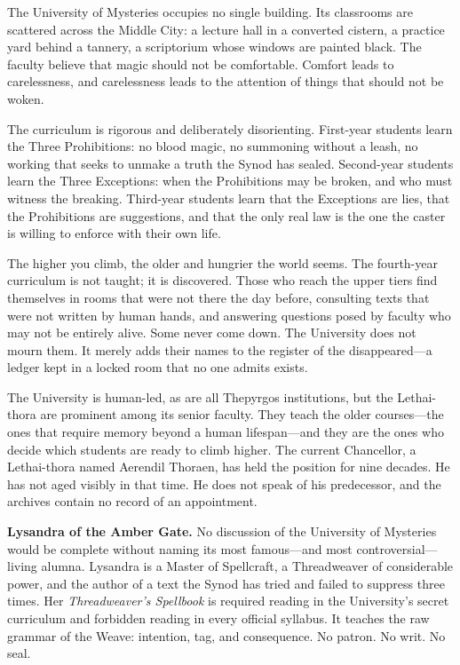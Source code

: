 \documentclass[10pt,twocolumn]{book}
\begin{document}
The University of Mysteries occupies no single building. Its classrooms are scattered across the Middle City: a lecture hall in a converted cistern, a practice yard behind a tannery, a scriptorium whose windows are painted black. The faculty believe that magic should not be comfortable. Comfort leads to carelessness, and carelessness leads to the attention of things that should not be woken.

The curriculum is rigorous and deliberately disorienting. First-year students learn the Three Prohibitions: no blood magic, no summoning without a leash, no working that seeks to unmake a truth the Synod has sealed. Second-year students learn the Three Exceptions: when the Prohibitions may be broken, and who must witness the breaking. Third-year students learn that the Exceptions are lies, that the Prohibitions are suggestions, and that the only real law is the one the caster is willing to enforce with their own life.

The higher you climb, the older and hungrier the world seems. The fourth-year curriculum is not taught; it is discovered. Those who reach the upper tiers find themselves in rooms that were not there the day before, consulting texts that were not written by human hands, and answering questions posed by faculty who may not be entirely alive. Some never come down. The University does not mourn them. It merely adds their names to the register of the disappeared---a ledger kept in a locked room that no one admits exists.

The University is human-led, as are all Thepyrgos institutions, but the Lethai-thora are prominent among its senior faculty. They teach the older courses---the ones that require memory beyond a human lifespan---and they are the ones who decide which students are ready to climb higher. The current Chancellor, a Lethai-thora named Aerendil Thoraen, has held the position for nine decades. He has not aged visibly in that time. He does not speak of his predecessor, and the archives contain no record of an appointment.

\noindent\textbf{Lysandra of the Amber Gate.} No discussion of the University of Mysteries would be complete without naming its most famous---and most controversial---living alumna. Lysandra is a Master of Spellcraft, a Threadweaver of considerable power, and the author of a text the Synod has tried and failed to suppress three times. Her \textit{Threadweaver's Spellbook} is required reading in the University's secret curriculum and forbidden reading in every official syllabus. It teaches the raw grammar of the Weave: intention, tag, and consequence. No patron. No writ. No seal.
\end{document}
